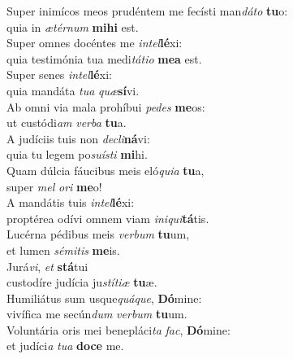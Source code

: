 \evenverse Super inimícos meos prudéntem me fecísti man\textit{dá}\textit{to} \textbf{tu}o:~\*\\
\evenverse quia in \textit{æ}\textit{tér}\textit{num} \textbf{mi}\textbf{hi} est.\\
\oddverse Super omnes docéntes me \textit{in}\textit{tel}\textbf{lé}xi:~\*\\
\oddverse quia testimónia tua medi\textit{tá}\textit{ti}\textit{o} \textbf{me}\textbf{a} est.\\
\evenverse Super senes \textit{in}\textit{tel}\textbf{lé}xi:~\*\\
\evenverse quia mandáta \textit{tu}\textit{a} \textit{quæ}\textbf{sí}vi.\\
\oddverse Ab omni via mala prohíbui \textit{pe}\textit{des} \textbf{me}os:~\*\\
\oddverse ut custódi\textit{am} \textit{ver}\textit{ba} \textbf{tu}a.\\
\evenverse A judíciis tuis non \textit{de}\textit{cli}\textbf{ná}vi:~\*\\
\evenverse quia tu legem po\textit{su}\textit{í}\textit{sti} \textbf{mi}hi.\\
\oddverse Quam dúlcia fáucibus meis eló\textit{qui}\textit{a} \textbf{tu}a,~\*\\
\oddverse super \textit{mel} \textit{o}\textit{ri} \textbf{me}o!\\
\evenverse A mandátis tuis \textit{in}\textit{tel}\textbf{lé}xi:~\*\\
\evenverse proptérea odívi omnem viam \textit{i}\textit{ni}\textit{qui}\textbf{tá}tis.\\
\oddverse Lucérna pédibus meis \textit{ver}\textit{bum} \textbf{tu}um,~\*\\
\oddverse et lumen \textit{sé}\textit{mi}\textit{tis} \textbf{me}is.\\
\evenverse Jurá\textit{vi}, \textit{et} \textbf{stá}tui~\*\\
\evenverse custodíre judícia ju\textit{stí}\textit{ti}\textit{æ} \textbf{tu}æ.\\
\oddverse Humiliátus sum usque\textit{quá}\textit{que}, \textbf{Dó}mine:~\*\\
\oddverse vivífica me secún\textit{dum} \textit{ver}\textit{bum} \textbf{tu}um.\\
\evenverse Voluntária oris mei benepláci\textit{ta} \textit{fac}, \textbf{Dó}mine:~\*\\
\evenverse et judíci\textit{a} \textit{tu}\textit{a} \textbf{do}\textbf{ce} me.\\
